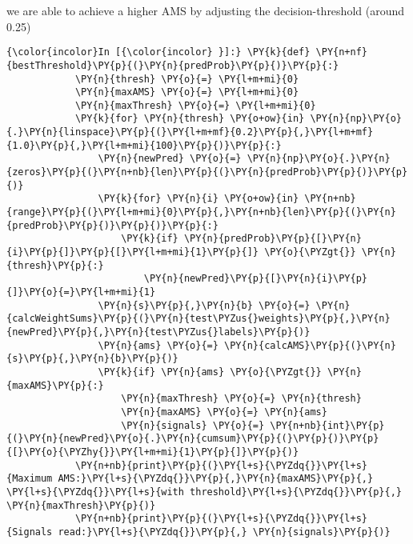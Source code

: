     we are able to achieve a higher AMS by adjusting the decision-threshold
(around 0.25)

    \begin{Verbatim}[commandchars=\\\{\}]
{\color{incolor}In [{\color{incolor} }]:} \PY{k}{def} \PY{n+nf}{bestThreshold}\PY{p}{(}\PY{n}{predProb}\PY{p}{)}\PY{p}{:}
            \PY{n}{thresh} \PY{o}{=} \PY{l+m+mi}{0}
            \PY{n}{maxAMS} \PY{o}{=} \PY{l+m+mi}{0}
            \PY{n}{maxThresh} \PY{o}{=} \PY{l+m+mi}{0}
            \PY{k}{for} \PY{n}{thresh} \PY{o+ow}{in} \PY{n}{np}\PY{o}{.}\PY{n}{linspace}\PY{p}{(}\PY{l+m+mf}{0.2}\PY{p}{,}\PY{l+m+mf}{1.0}\PY{p}{,}\PY{l+m+mi}{100}\PY{p}{)}\PY{p}{:}
                \PY{n}{newPred} \PY{o}{=} \PY{n}{np}\PY{o}{.}\PY{n}{zeros}\PY{p}{(}\PY{n+nb}{len}\PY{p}{(}\PY{n}{predProb}\PY{p}{)}\PY{p}{)}
                \PY{k}{for} \PY{n}{i} \PY{o+ow}{in} \PY{n+nb}{range}\PY{p}{(}\PY{l+m+mi}{0}\PY{p}{,}\PY{n+nb}{len}\PY{p}{(}\PY{n}{predProb}\PY{p}{)}\PY{p}{)}\PY{p}{:}
                    \PY{k}{if} \PY{n}{predProb}\PY{p}{[}\PY{n}{i}\PY{p}{]}\PY{p}{[}\PY{l+m+mi}{1}\PY{p}{]} \PY{o}{\PYZgt{}} \PY{n}{thresh}\PY{p}{:}
                        \PY{n}{newPred}\PY{p}{[}\PY{n}{i}\PY{p}{]}\PY{o}{=}\PY{l+m+mi}{1}
                \PY{n}{s}\PY{p}{,}\PY{n}{b} \PY{o}{=} \PY{n}{calcWeightSums}\PY{p}{(}\PY{n}{test\PYZus{}weights}\PY{p}{,}\PY{n}{newPred}\PY{p}{,}\PY{n}{test\PYZus{}labels}\PY{p}{)}
                \PY{n}{ams} \PY{o}{=} \PY{n}{calcAMS}\PY{p}{(}\PY{n}{s}\PY{p}{,}\PY{n}{b}\PY{p}{)}
                \PY{k}{if} \PY{n}{ams} \PY{o}{\PYZgt{}} \PY{n}{maxAMS}\PY{p}{:}
                    \PY{n}{maxThresh} \PY{o}{=} \PY{n}{thresh}
                    \PY{n}{maxAMS} \PY{o}{=} \PY{n}{ams}
                    \PY{n}{signals} \PY{o}{=} \PY{n+nb}{int}\PY{p}{(}\PY{n}{newPred}\PY{o}{.}\PY{n}{cumsum}\PY{p}{(}\PY{p}{)}\PY{p}{[}\PY{o}{\PYZhy{}}\PY{l+m+mi}{1}\PY{p}{]}\PY{p}{)}
            \PY{n+nb}{print}\PY{p}{(}\PY{l+s}{\PYZdq{}}\PY{l+s}{Maximum AMS:}\PY{l+s}{\PYZdq{}}\PY{p}{,}\PY{n}{maxAMS}\PY{p}{,} \PY{l+s}{\PYZdq{}}\PY{l+s}{with threshold}\PY{l+s}{\PYZdq{}}\PY{p}{,} \PY{n}{maxThresh}\PY{p}{)}
            \PY{n+nb}{print}\PY{p}{(}\PY{l+s}{\PYZdq{}}\PY{l+s}{Signals read:}\PY{l+s}{\PYZdq{}}\PY{p}{,} \PY{n}{signals}\PY{p}{)}
\end{Verbatim}

